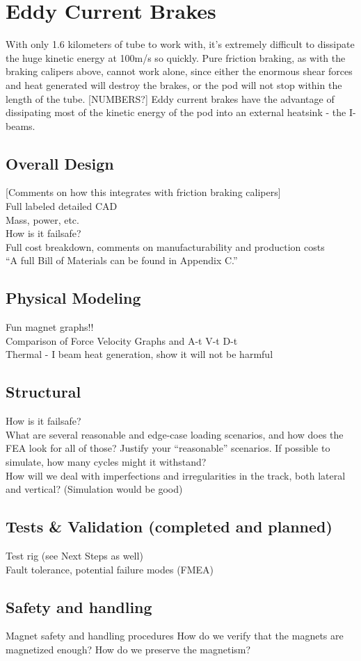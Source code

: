 \documentclass[main.tex]{subfile}
\begin{document}
    \section{Eddy Current Brakes}
    With only 1.6 kilometers of tube to work with, it’s extremely difficult to dissipate the huge kinetic energy at 100m/s so quickly. Pure friction braking, as with the braking calipers above, cannot work alone, since either the enormous shear forces and heat generated will destroy the brakes, or the pod will not stop within the length of the tube. [NUMBERS?] Eddy current brakes have the advantage of dissipating most of the kinetic energy of the pod into an external heatsink - the I-beams.

    \subsection{Overall Design}
    [Comments on how this integrates with friction braking calipers]\\
    Full labeled detailed CAD\\
    Mass, power, etc.\\
    How is it failsafe?\\
    Full cost breakdown, comments on manufacturability and production costs\\
    “A full Bill of Materials can be found in Appendix C.”

    \subsection{Physical Modeling}
    Fun magnet graphs!!\\
    Comparison of Force Velocity Graphs and A-t V-t D-t\\
    Thermal - I beam heat generation, show it will not be harmful

    \subsection{Structural}
    How is it failsafe?\\
    What are several reasonable and edge-case loading scenarios, and how does the FEA look for all of those? Justify your “reasonable” scenarios. If possible to simulate, how many cycles might it withstand?\\
    How will we deal with imperfections and irregularities in the track, both lateral and vertical? (Simulation would be good)

    \subsection{Tests \& Validation (completed and planned)}
    Test rig (see Next Steps as well)\\
    Fault tolerance, potential failure modes (FMEA)

    \subsection{Safety and handling}
    Magnet safety and handling procedures
    How do we verify that the magnets are magnetized enough? How do we preserve the magnetism?
\end{document}
